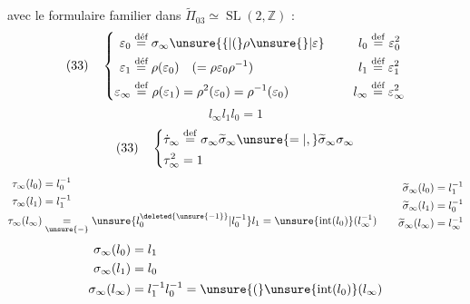 avec le formulaire familier dans $\widetilde\Pi_{03}\simeq\operatorname{SL}(2,\mathbb Z)$ :
\[
(33)\quad\left\{\begin{aligned}
\varepsilon_0&\overset{\text{déf}}=\sigma_\infty\unsure{\{|(}\rho\unsure{\}|\varepsilon}\\
\varepsilon_1&\overset{\text{déf}}=\rho(\varepsilon_0)\quad(=\rho\varepsilon_0\rho^{-1})\\
\varepsilon_\infty&\overset{\mathrm{def}}=\rho(\varepsilon_1)=\rho^2(\varepsilon_0)=\rho^{-1}(\varepsilon_0)
\end{aligned}\right.\qquad\begin{aligned}
l_0&\overset{\mathrm{def}}=\varepsilon_0^2\\
l_1&\overset{\text{déf}}=\varepsilon_1^2\\
l_\infty&\overset{\text{déf}}=\varepsilon_\infty^2
\end{aligned}
\]
\[
l_\infty l_1l_0=1
\]
\[
(33)\quad\left\{\begin{aligned}
\dot\tau_\infty&\overset{\mathrm{def}}=\sigma_\infty\widetilde\sigma_\infty\unsure{=|,}\widetilde\sigma_\infty\sigma_\infty\\
\tau_\infty^2&=1
\end{aligned}\right.
\]
\[
\begin{aligned}\tau_\infty(l_0)&=l_0^{-1}\\\tau_\infty(l_1)&=l_1^{-1}\\
\tau_\infty(l_\infty)&\underset{\unsure{-}}{=}\unsure{l_0^{\deleted{\unsure{-1}}}|l_0^{-1}}l_1=\unsure{\operatorname{int}(l_0)}(l_\infty^{-1})
\end{aligned}
\qquad
\begin{aligned}\widetilde\sigma_\infty(l_0)&=l_1^{-1}\\\widetilde\sigma_\infty(l_1)&=l_0^{-1}\\\widetilde\sigma_\infty(l_\infty)&=l_\infty^{-1}\end{aligned}
\]
\[
\begin{aligned}\sigma_\infty(l_0)&=l_1\\\sigma_\infty(l_1)&=l_0\\\sigma_\infty(l_\infty)&=l_1^{-1}l_0^{-1}=\unsure{(}\unsure{\operatorname{int}(l_0)}(l_\infty)\end{aligned}
\]
